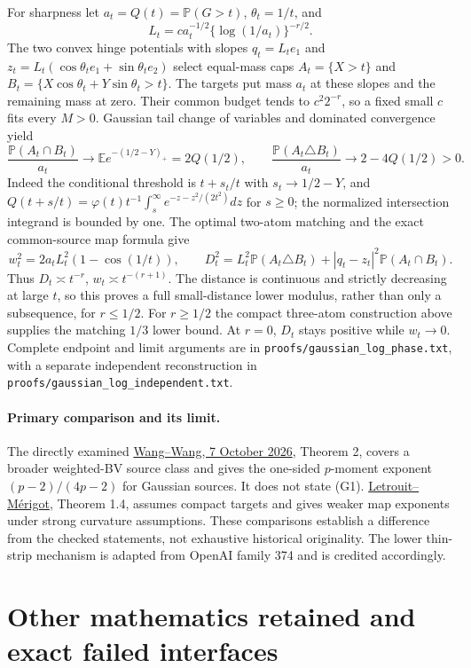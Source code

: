 \documentclass[11pt]{article}
\begin{document}
For sharpness let $a_t=Q(t)=\mathbb P(G>t)$, $\theta_t=1/t$, and
\[
L_t=c a_t^{-1/2}\{\log(1/a_t)\}^{-r/2}.
\]
The two convex hinge potentials with slopes $q_t=L_te_1$ and $z_t=L_t(\cos\theta_t e_1+\sin\theta_t e_2)$ select equal-mass caps $A_t=\{X>t\}$ and $B_t=\{X\cos\theta_t+Y\sin\theta_t>t\}$. The targets put mass $a_t$ at these slopes and the remaining mass at zero. Their common budget tends to $c^2 2^{-r}$, so a fixed small $c$ fits every $M>0$. Gaussian tail change of variables and dominated convergence yield
\[
\frac{\mathbb P(A_t\cap B_t)}{a_t}
\longrightarrow\mathbb E e^{-(1/2-Y)_+}=2Q(1/2),\qquad
\frac{\mathbb P(A_t\triangle B_t)}{a_t}\longrightarrow2-4Q(1/2)>0.
\]
Indeed the conditional threshold is $t+s_t/t$ with $s_t\to1/2-Y$, and
$Q(t+s/t)=\varphi(t)t^{-1}\int_s^\infty e^{-z-z^2/(2t^2)}dz$ for $s\ge0$; the normalized intersection integrand is bounded by one. The optimal two-atom matching and the exact common-source map formula give
\[
w_t^2=2a_tL_t^2(1-\cos(1/t)),\qquad
D_t^2=L_t^2\mathbb P(A_t\triangle B_t)+|q_t-z_t|^2\mathbb P(A_t\cap B_t).
\]
Thus $D_t\asymp t^{-r}$, $w_t\asymp t^{-(r+1)}$. The distance is continuous and strictly decreasing at large $t$, so this proves a full small-distance lower modulus, rather than only a subsequence, for $r\le1/2$. For $r\ge1/2$ the compact three-atom construction above supplies the matching $1/3$ lower bound. At $r=0$, $D_t$ stays positive while $w_t\to0$. Complete endpoint and limit arguments are in \texttt{proofs/gaussian\_log\_phase.txt}, with a separate independent reconstruction in \texttt{proofs/gaussian\_log\_independent.txt}.

\paragraph{Primary comparison and its limit.}
The directly examined \href{https://arxiv.org/html/2610.09640v1}{Wang--Wang, 7 October 2026}, Theorem 2, covers a broader weighted-BV source class and gives the one-sided $p$-moment exponent $(p-2)/(4p-2)$ for Gaussian sources. It does not state (G1). \href{https://arxiv.org/html/2411.04908v3}{Letrouit--M\'erigot}, Theorem 1.4, assumes compact targets and gives weaker map exponents under strong curvature assumptions. These comparisons establish a difference from the checked statements, not exhaustive historical originality. The lower thin-strip mechanism is adapted from OpenAI family 374 and is credited accordingly.

\section{Other mathematics retained and exact failed interfaces}
\end{document}
